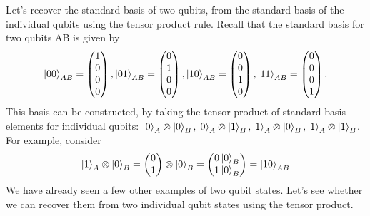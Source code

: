\begin{example}
    Let’s recover the standard basis of two qubits, from the standard basis of the
individual qubits using the tensor product rule. Recall that the standard basis for two qubits AB is given by
\[
\ket{00}_{AB}=\begin{pmatrix} 1\\ 0 \\ 0\\ 0 \end{pmatrix}, \ket{01}_{AB}=\begin{pmatrix} 0 \\ 1 \\ 0 \\ 0 \end{pmatrix}, \ket{10}_{AB}=\begin{pmatrix} 0 \\ 0 \\1 \\ 0 \end{pmatrix}, \ket{11}_{AB}=\begin{pmatrix} 0 \\ 0 \\ 0 \\1\end{pmatrix}.
\]
This basis can be constructed, by taking the tensor product of standard basis elements for individual qubits: $\ket{0}_A \otimes \ket{0}_B, \ket{0}_A \otimes \ket{1}_B, \ket{1}_A\otimes \ket{0}_B, \ket{1}_A\otimes \ket{1}_B$. For example, consider
\[
\ket{1}_A\otimes \ket{0}_B = \begin{pmatrix} 0 \\ 1 \end{pmatrix} \otimes \ket{0}_B = \begin{pmatrix} 0 \ket{0}_B\\ 1 \ket{0}_B \end{pmatrix} = \ket{10}_{AB}
\]
We have already seen a few other examples of two qubit states. Let’s see whether we can
recover them from two individual qubit states using the tensor product.
\end{example}

